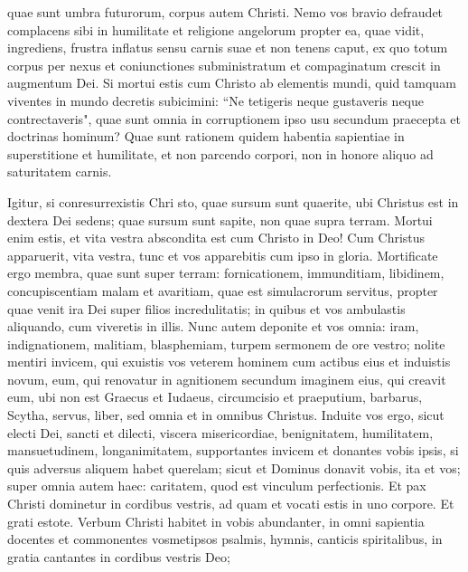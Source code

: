 \begin{biblechapter}
\verse quae sunt umbra futurorum, corpus autem Christi. 
\verse Nemo vos bravio defraudet complacens sibi in humilitate et religione angelorum propter ea, quae vidit, ingrediens, frustra inflatus sensu carnis suae 
\verse et non tenens caput, ex quo totum corpus per nexus et coniunctiones subministratum et compaginatum crescit in augmentum Dei. 
\verse Si mortui estis cum Christo ab elementis mundi, quid tamquam viventes in mundo decretis subicimini: 
\verse “Ne tetigeris neque gustaveris neque contrectaveris", 
\verse quae sunt omnia in corruptionem ipso usu secundum praecepta et doctrinas hominum? 
\verse Quae sunt rationem quidem habentia sapientiae in superstitione et humilitate, et non parcendo corpori, non in honore aliquo ad saturitatem carnis. 
\end{biblechapter}

\begin{biblechapter}  
\verse Igitur, si conresurrexistis Chri sto, quae sursum sunt quaerite, ubi Christus est in dextera Dei sedens; 
\verse quae sursum sunt sapite, non quae supra terram.  
\verse Mortui enim estis, et vita vestra abscondita est cum Christo in Deo! 
\verse Cum Christus apparuerit, vita vestra, tunc et vos apparebitis cum ipso in gloria. 
\verse Mortificate ergo membra, quae sunt super terram: fornicationem, immunditiam, libidinem, concupiscentiam malam et avaritiam, quae est simulacrorum servitus,  
\verse propter quae venit ira Dei super filios incredulitatis; 
\verse in quibus et vos ambulastis aliquando, cum viveretis in illis. 
\verse Nunc autem deponite et vos omnia: iram, indignationem, malitiam, blasphemiam, turpem sermonem de ore vestro; 
\verse nolite mentiri invicem, qui exuistis vos veterem hominem cum actibus eius 
\verse et induistis novum, eum, qui renovatur in agnitionem secundum imaginem eius, qui creavit eum, 
\verse ubi non est Graecus et Iudaeus, circumcisio et praeputium, barbarus, Scytha, servus, liber, sed omnia et in omnibus Christus. 
\verse Induite vos ergo, sicut electi Dei, sancti et dilecti, viscera misericordiae, benignitatem, humilitatem, mansuetudinem, longanimitatem, 
\verse supportantes invicem et donantes vobis ipsis, si quis adversus aliquem habet querelam; sicut et Dominus donavit vobis, ita et vos; 
\verse super omnia autem haec: caritatem, quod est vinculum perfectionis. 
\verse Et pax Christi dominetur in cordibus vestris, ad quam et vocati estis in uno corpore. Et grati estote. 
\verse Verbum Christi habitet in vobis abundanter, in omni sapientia docentes et commonentes vosmetipsos psalmis, hymnis, canticis spiritalibus, in gratia cantantes in cordibus vestris Deo; 

\end{biblechapter}
